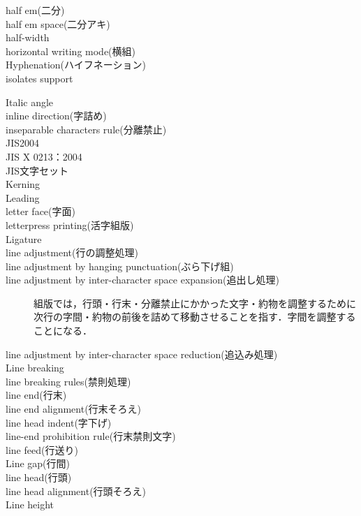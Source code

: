 \begin{description}
    \item[half em(二分)]
    \item[half em space(二分アキ)]
    \item[half-width]
    \item[horizontal writing mode(横組)]
    \item[Hyphenation(ハイフネーション)]
    \item[isolates support]\cite{developer.apple.com:videos/play/wwdc2016/232/}
    \item[Italic angle]
    \item[inline direction(字詰め)]
    \item[inseparable characters rule(分離禁止)]
    \item[JIS2004]
    \item[JIS X 0213：2004]
    \item[JIS文字セット]
    \item[Kerning]
    \item[Leading]
    \item[letter face(字面)]
    \item[letterpress printing(活字組版)]
    \item[Ligature]
    \item[line adjustment(行の調整処理)]
    \item[line adjustment by hanging punctuation(ぶら下げ組)]
    \item[line adjustment by inter-character space expansion(追出し処理)] 組版では，行頭・行末・分離禁止にかかった文字・約物を調整するために次行の字間・約物の前後を詰めて移動させることを指す．字間を調整することになる\cite{www.jpp.co.jp:yougo/a1.html}．
    \item[line adjustment by inter-character space reduction(追込み処理)]
    \item[Line breaking]
    \item[line breaking rules(禁則処理)]
    \item[line end(行末)]
    \item[line end alignment(行末そろえ)]
    \item[line head indent(字下げ)]
    \item[line-end prohibition rule(行末禁則文字)]
    \item[line feed(行送り)]
    \item[Line gap(行間)]
    \item[line head(行頭)]
    \item[line head alignment(行頭そろえ)]
    \item[Line height]

\end{description}

